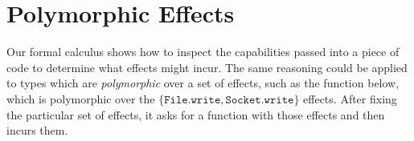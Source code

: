 \documentclass[sigplan,10pt,review]{acmart}\settopmatter{printfolios=true,printccs=false,printacmref=false}
\newcommand{\kwa}[1]{\mathtt{#1}}
\newcommand{\epscalc}{\kwa{CC}}
\begin{document}
%
%
%

\section{Polymorphic Effects}

Our formal calculus shows how to inspect the capabilities passed into a piece of code to determine what effects might incur. The same reasoning could be applied to types which are \textit{polymorphic} over a set of effects, such as the function below, which is polymorphic over the $\{ \kwa{File.write, Socket.write} \}$ effects. After fixing the particular set of effects, it asks for a function with those effects and then incurs them.
\end{document}
